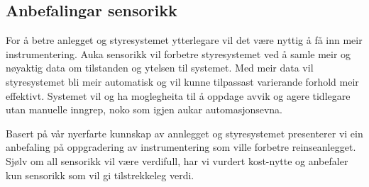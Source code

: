 \newpage

\subsection{Anbefalingar sensorikk}

For å betre anlegget og styresystemet ytterlegare vil det være nyttig å få inn meir instrumentering. 
Auka sensorikk vil forbetre styresystemet ved å samle meir og nøyaktig data om tilstanden og ytelsen til systemet. 
Med meir data vil styresystemet bli meir automatisk og vil kunne tilpassast varierande forhold meir effektivt. 
Systemet vil og ha moglegheita til å oppdage avvik og agere tidlegare utan manuelle inngrep, noko som igjen aukar automasjonsevna.

Basert på vår nyerfarte kunnskap av annlegget og styresystemet presenterer vi ein
anbefaling på oppgradering av instrumentering som ville forbetre reinseanlegget. 
Sjølv om all sensorikk vil være verdifull, har vi vurdert kost-nytte og anbefaler kun sensorikk som vil gi tilstrekkeleg verdi.

